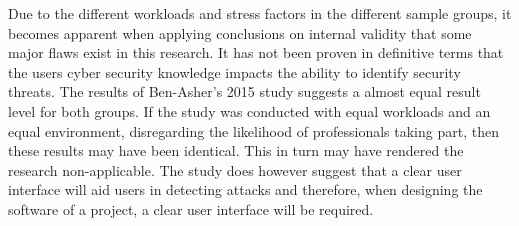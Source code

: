 Due to the different workloads and stress factors in the different sample groups, it becomes apparent when applying \citeauthor{bryman_2016} conclusions on internal validity that some major flaws exist in this research. It has not been proven in definitive terms that the users cyber security knowledge impacts the ability to identify security threats. The results of Ben-Asher's 2015 study suggests a almost equal result level for both groups. If the study was conducted with equal workloads and an equal environment, disregarding the likelihood of professionals taking part, then these results may have been identical. This in turn may have rendered the research non-applicable. The study does however suggest that a clear user interface will aid users in detecting attacks and therefore, when designing the software of a project, a clear user interface will be required. 